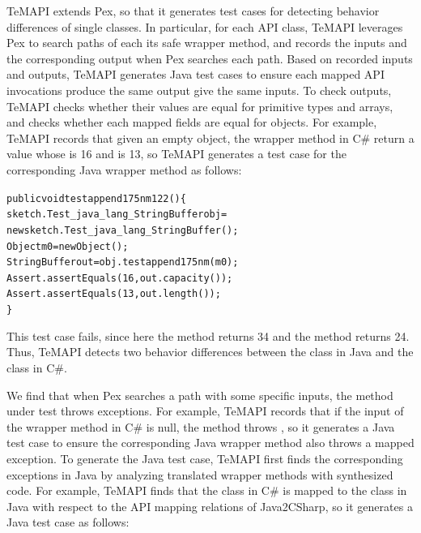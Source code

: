 TeMAPI extends Pex, so that it generates test cases for detecting behavior differences of single classes. In particular, for each API class, TeMAPI leverages Pex to search paths of each its safe wrapper method, and records the inputs and the corresponding output when Pex searches each path. Based on recorded inputs and outputs, TeMAPI generates Java test cases to ensure each mapped API invocations produce the same output give the same inputs. To check outputs, TeMAPI checks whether their values are equal for primitive types and arrays, and checks whether each mapped fields are equal for objects. For example, TeMAPI records that given an empty object, the  wrapper method in C\# return a  value whose  is 16 and  is 13, so TeMAPI generates a test case for the corresponding Java wrapper method as follows:

\begin{CodeOut}\vspace*{-1ex}
\begin{alltt}
public void testappend175nm122()\{
  sketch.Test_java_lang_StringBuffer obj =
      new sketch.Test_java_lang_StringBuffer();
  Object m0 = new Object();
  StringBuffer out = obj.testappend175nm(m0);
  Assert.assertEquals(16, out.capacity());	
  Assert.assertEquals(13, out.length());
\}
\end{alltt}
\end{CodeOut}\vspace*{-2ex}

This test case fails, since here the  method returns 34 and the  method returns 24. Thus, TeMAPI detects two behavior differences between the  class in Java and the  class in C\#.


We find that when Pex searches a path with some specific inputs, the method under test throws exceptions.
For example, TeMAPI records that if the input of the  wrapper method in C\# is null, the method throws , so it generates a Java test case to ensure the corresponding Java wrapper method also throws a mapped exception. To generate the Java test case, TeMAPI first finds the corresponding exceptions in Java by analyzing translated wrapper methods with synthesized code. For example, TeMAPI finds that the  class in C\# is mapped to the  class in Java with respect to the API mapping relations of Java2CSharp, so it generates a Java test case as follows:

